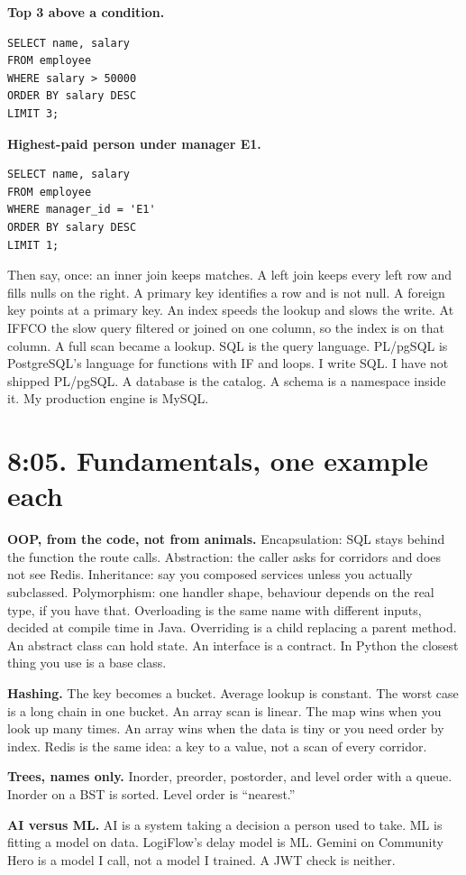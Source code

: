 \documentclass[a4paper,9.5pt]{extarticle}
\begin{document}
\textbf{Top 3 above a condition.}
\begin{verbatim}
SELECT name, salary
FROM employee
WHERE salary > 50000
ORDER BY salary DESC
LIMIT 3;
\end{verbatim}

\textbf{Highest-paid person under manager E1.}
\begin{verbatim}
SELECT name, salary
FROM employee
WHERE manager_id = 'E1'
ORDER BY salary DESC
LIMIT 1;
\end{verbatim}

\noindent Then say, once: an inner join keeps matches. A left join keeps every left row and fills nulls on the right. A primary key identifies a row and is not null. A foreign key points at a primary key. An index speeds the lookup and slows the write. At IFFCO the slow query filtered or joined on one column, so the index is on that column. A full scan became a lookup. SQL is the query language. PL/pgSQL is PostgreSQL's language for functions with IF and loops. I write SQL. I have not shipped PL/pgSQL. A database is the catalog. A schema is a namespace inside it. My production engine is MySQL.

\section{8:05. Fundamentals, one example each}
\textbf{OOP, from the code, not from animals.} Encapsulation: SQL stays behind the function the route calls. Abstraction: the caller asks for corridors and does not see Redis. Inheritance: say you composed services unless you actually subclassed. Polymorphism: one handler shape, behaviour depends on the real type, if you have that. Overloading is the same name with different inputs, decided at compile time in Java. Overriding is a child replacing a parent method. An abstract class can hold state. An interface is a contract. In Python the closest thing you use is a base class.

\textbf{Hashing.} The key becomes a bucket. Average lookup is constant. The worst case is a long chain in one bucket. An array scan is linear. The map wins when you look up many times. An array wins when the data is tiny or you need order by index. Redis is the same idea: a key to a value, not a scan of every corridor.

\textbf{Trees, names only.} Inorder, preorder, postorder, and level order with a queue. Inorder on a BST is sorted. Level order is ``nearest.''

\textbf{AI versus ML.} AI is a system taking a decision a person used to take. ML is fitting a model on data. LogiFlow's delay model is ML. Gemini on Community Hero is a model I call, not a model I trained. A JWT check is neither.
\end{document}
